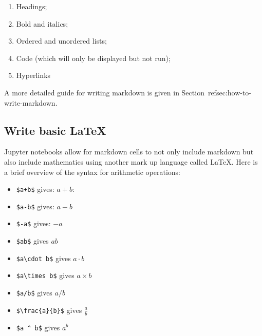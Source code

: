 \begin{enumerate}

\item 

Headings;

\item 

Bold and italics;

\item 

Ordered and unordered lists;

\item 

Code (which will only be displayed but not run);

\item 

Hyperlinks

\end{enumerate}

A more detailed guide for writing markdown is given in Section~ref{sec:how-to-write-markdown}.

\subsection{Write basic LaTeX}

Jupyter notebooks allow for markdown cells to not only include markdown but also
include mathematics using another mark up language called \LaTeX.
Here is a brief overview of the syntax for arithmetic operations:
\begin{itemize}
\item 

\texttt{\$a+b\$} gives: \(a + b\):

\item 

\texttt{\$a-b\$} gives: \(a-b\)

\item 

\texttt{\$-a\$} gives: \(-a\)

\item 

\texttt{\$ab\$} gives \(ab\)

\item 

\texttt{\$a\textbackslash{}cdot b\$} gives \(a\cdot b\)

\item 

\texttt{\$a\textbackslash{}times b\$} gives \(a\times b\)

\item 

\texttt{\$a/b\$} gives \(a/b\)

\item 

\texttt{\$\textbackslash{}frac\{a\}\{b\}\$} gives \(\frac{a}{b}\)

\item 

\texttt{\$a \textasciicircum{} b\$} gives \(a ^ b\)

\end{itemize}


